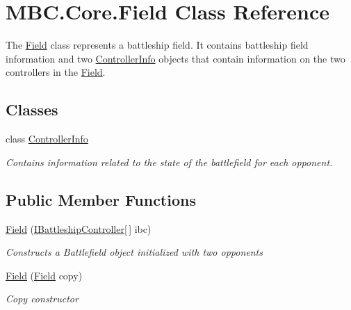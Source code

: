 \hypertarget{class_m_b_c_1_1_core_1_1_field}{\section{M\-B\-C.\-Core.\-Field Class Reference}
\label{class_m_b_c_1_1_core_1_1_field}
}


The \hyperlink{class_m_b_c_1_1_core_1_1_field}{Field} class represents a battleship field. It contains battleship field information and two \hyperlink{class_m_b_c_1_1_core_1_1_field_1_1_controller_info}{Controller\-Info} objects that contain information on the two controllers in the \hyperlink{class_m_b_c_1_1_core_1_1_field}{Field}.  


\subsection*{Classes}
\begin{DoxyCompactItemize}
\item 
class \hyperlink{class_m_b_c_1_1_core_1_1_field_1_1_controller_info}{Controller\-Info}
\begin{DoxyCompactList}\small\item\em Contains information related to the state of the battlefield for each opponent.\end{DoxyCompactList}\end{DoxyCompactItemize}
\subsection*{Public Member Functions}
\begin{DoxyCompactItemize}
\item 
\hypertarget{class_m_b_c_1_1_core_1_1_field_a7310ab93b09a8cd557e4fdcc3f686a78}{\hyperlink{class_m_b_c_1_1_core_1_1_field_a7310ab93b09a8cd557e4fdcc3f686a78}{Field} (\hyperlink{interface_m_b_c_1_1_core_1_1_i_battleship_controller}{I\-Battleship\-Controller}\mbox{[}$\,$\mbox{]} ibc)}\label{class_m_b_c_1_1_core_1_1_field_a7310ab93b09a8cd557e4fdcc3f686a78}

\begin{DoxyCompactList}\small\item\em Constructs a Battlefield object initialized with two opponents\end{DoxyCompactList}\item 
\hypertarget{class_m_b_c_1_1_core_1_1_field_a48bb106fc9697c3a8bd7139d06f4aa09}{\hyperlink{class_m_b_c_1_1_core_1_1_field_a48bb106fc9697c3a8bd7139d06f4aa09}{Field} (\hyperlink{class_m_b_c_1_1_core_1_1_field}{Field} copy)}\label{class_m_b_c_1_1_core_1_1_field_a48bb106fc9697c3a8bd7139d06f4aa09}

\begin{DoxyCompactList}\small\item\em Copy constructor\end{DoxyCompactList}\end{DoxyCompactItemize}
